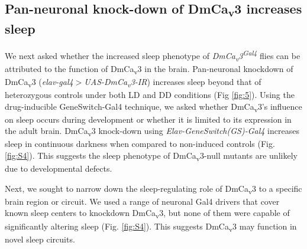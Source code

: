 \subsection*{Pan-neuronal knock-down of DmCa\textsubscript{v}3 increases sleep}

We next asked whether the increased sleep phenotype of \emph{DmCa\textsubscript{v}3\textsuperscript{Gal4}} flies can be attributed to the function of DmCa\textsubscript{v}3 in the brain.
Pan-neuronal knockdown of DmCa\textsubscript{v}3 (\emph{elav-gal4$>$UAS-DmCa\textsubscript{v}3-IR}) increases sleep beyond that of heterozygous controls under both LD and DD conditions (Fig \ref{fig:5}).
Using the drug-inducible GeneSwitch-Gal4 technique\cite{Osterwalder:2001cl}, we asked whether DmCa\textsubscript{v}3's influence on sleep occurs during development or whether it is limited to its expression in the adult brain.
DmCa\textsubscript{v}3 knock-down using \emph{Elav-GeneSwitch(GS)-Gal4} increases sleep in continuous darkness when compared to non-induced controls (Fig.\ref{fig:S4}).
This suggests the sleep phenotype of DmCa\textsubscript{v}3-null mutants are unlikely due to developmental defects.

Next, we sought to narrow down the sleep-regulating role of DmCa\textsubscript{v}3 to a specific brain region or circuit.
We used a range of neuronal Gal4 drivers that cover known sleep centers to knockdown DmCa\textsubscript{v}3, but none of them were capable of significantly altering sleep (Fig. \ref{fig:S4}).
This suggests DmCa\textsubscript{v}3 may function in novel sleep circuits.